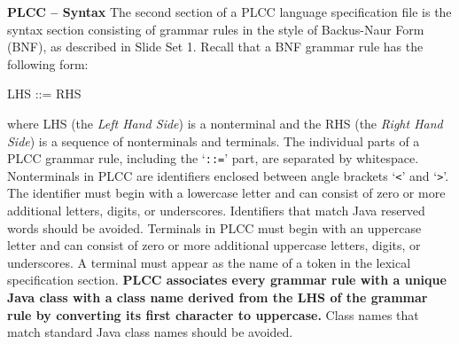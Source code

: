 \begin{minipage}[t]{\sw}
\slidenumber
\LARGE
{\bf PLCC -- Syntax}\exx
The second section of a PLCC language specification file
is the syntax section consisting
of grammar rules in the style of Backus-Naur Form (BNF),
as described in Slide Set 1.
Recall that a BNF grammar rule has the following form:
{\Large
\begin{qv}
LHS ::= RHS
\end{qv}
}
where LHS (the {\em Left Hand Side}) is a nonterminal
and the RHS (the {\em Right Hand Side}) is a sequence
of nonterminals and terminals.
The individual parts of a PLCC grammar rule,
including the `\verb'::='' part,
are separated by whitespace.\exx
Nonterminals in PLCC are identifiers enclosed
between angle brackets `\verb'<'' and `\verb'>''.
The identifier must begin with a lowercase letter
and can consist of zero or more additional letters, digits, or underscores.
Identifiers that match Java reserved words should be avoided.\exx
Terminals in PLCC must begin with an uppercase letter
and can consist of zero or more additional uppercase letters, digits,
or underscores.
A terminal must appear as the name of a token
in the lexical specification section.\exx
{\bf PLCC associates every grammar rule
with a unique Java class with a class name derived
from the LHS of the grammar rule by converting its first character
to uppercase.}
Class names that match standard Java class names should be avoided.
\end{minipage}
\clearpage
